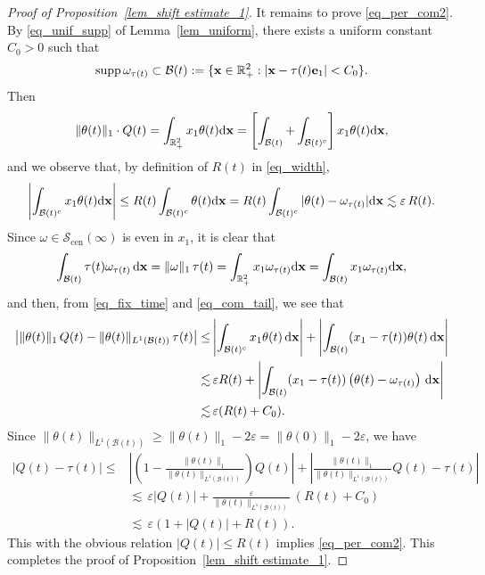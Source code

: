 \documentclass[11pt]{amsart}
\theoremstyle{definition}
\theoremstyle{definition}
\numberwithin{equation}{section}
\newcommand{\set}[1]{\{#1\}}
\newcommand{\supp}{{\mathrm{supp}}\,}
\newcommand{\0}{\emptyset}
\newcommand{\tht}{\theta}
\newcommand{\omg}{\omega}
\newcommand{\bfe}{{\bf e}}
\newcommand{\bfx}{{\bf x}}
\newcommand{\bbR}{\mathbb R}
\newcommand{\calB}{\mathcal B}
\newcommand{\calS}{\mathcal S}
\newcommand{\dd}{\mathrm{d}}
\begin{document}
\begin{proof}[Proof of Proposition~\ref{lem_shift estimate_1}]
				\medskip
				
				\noindent It remains to prove \eqref{eq_per_com2}.
				By \eqref{eq_unif_supp} of Lemma~\ref{lem_uniform}, there exists a uniform constant $C_0>0$ such that
				\[
				\supp\omg_{\tau(t)}\subset\calB(t) :=\set{\bfx\in\bbR^2_+:|\bfx-\tau(t)\bfe_1|<C_0}.
				\]
				Then
				$$
				\|\theta(t)\|_1 \cdot Q(t) = \int_{\bbR^2_+} x_1\tht(t)\dd\bfx = \left[ \int_{\calB(t)}  + \int_{\calB(t)^c} \right]x_1\tht(t)\dd\bfx,
				$$
				and we observe that, by definition of $R(t)$ in \eqref{eq_width},
				\begin{equation}
					\label{eq_com_tail}
					\left|\int_{\calB(t)^c} x_1\tht(t)\dd\bfx \right|\leq R(t)\int_{\calB(t)^c}\tht(t)\dd \bfx =  R(t)\int_{\calB(t)^c}|\tht(t)-\omg_{\tau(t)}|\dd\bfx \lesssim \varepsilon \, R(t).
				\end{equation}
				Since $\omega \in \calS_{\mathrm{cen}}(\infty)$ is even in $x_1$, it is clear that
				$$
				\int_{\calB(t)} \tau(t)\omega_{\tau(t)}\, \dd \bfx = \| \omega\|_1 \, \tau(t) = \int_{\bbR^2_+}x_1\omg_{\tau(t)}\dd\bfx=\int_{\calB(t)}x_1\omg_{\tau(t)}\dd\bfx,
				$$
				and then, from \eqref{eq_fix_time} and \eqref{eq_com_tail}, we see that
				\begin{align*}
					\left| \|\theta(t)\|_1 \,Q(t) - \|\theta(t)\|_{L^1(\calB(t))}\,\tau(t) \right| \le &\left| \int_{\calB(t)^c} x_1 \theta(t) \, \dd\bfx \right| + \left| \int_{\calB(t)} (x_1 - \tau(t)) \theta(t) \, \dd\bfx \right| \\
					\lesssim & \,\varepsilon R(t) + \left| \int_{\calB(t)} (x_1 - \tau(t)) \left( \theta(t) - \omega_{\tau(t)} \right) \, \dd\bfx \right| \\
					\lesssim &\, \varepsilon(R(t) + C_0).
				\end{align*}
				Since $\|\theta(t)\|_{L^1(\calB(t))} \ge \|\theta(t)\|_1 - 2\varepsilon = \|\theta(0)\|_1 - 2\varepsilon$, we have
				\begin{align*}
					\left|Q(t) - \tau(t) \right| \le &\left| \left(1 - \frac{\|\theta(t) \|_1}{\| \theta(t) \|_{L^1(\calB(t))}} \right)Q(t) \right| +  \left|   \frac{\|\theta(t) \|_1}{\| \theta(t) \|_{L^1(\calB(t))}} Q(t) - \tau(t)\right| \\
					& \lesssim \, \varepsilon  |Q(t)| + \frac{\varepsilon}{\| \theta(t) \|_{L^1(\calB(t))}} \,(R(t) + C_0) \\
					& \lesssim \, \varepsilon (1 + |Q(t)| + R(t)).
				\end{align*}
				This with the obvious relation $|Q(t)|\leq R(t)$ implies \eqref{eq_per_com2}.
				This completes the proof of Proposition~\ref{lem_shift estimate_1}.
			\end{proof}
			
\end{document}
